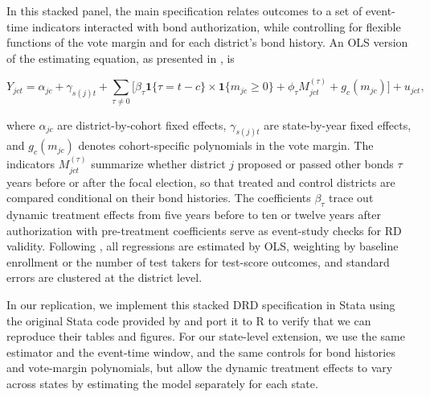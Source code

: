 In this stacked panel, the main specification relates outcomes to a set of event-time indicators interacted with bond authorization, while controlling for flexible functions of the vote margin and for each district’s bond history. An OLS version of the estimating equation, as presented in \citet{biasi_what_2025}, is

\[
Y_{jct}
= \alpha_{jc} + \gamma_{s(j)t}
+ \sum_{\tau \neq 0} \biggl[\beta_{\tau} \mathbf{1}\{\tau = t-c\} \times \mathbf{1}\{m_{jc} \ge 0\}
+ \phi_{\tau} M_{jct}^{(\tau)}
+ g_{c}(m_{jc})\biggr]
+ u_{jct},
\]

where $\alpha_{jc}$ are district-by-cohort fixed effects, $\gamma_{s(j)t}$ are state-by-year fixed effects, and $g_{c}(m_{jc})$ denotes cohort-specific polynomials in the vote margin. The indicators $M_{jct}^{(\tau)}$ summarize whether district $j$ proposed or passed other bonds $\tau$ years before or after the focal election, so that treated and control districts are compared conditional on their bond histories. The coefficients $\beta_{\tau}$ trace out dynamic treatment effects from five years before to ten or twelve years after authorization with pre-treatment coefficients serve as event-study checks for RD validity. Following \citet{biasi_what_2025}, all regressions are estimated by OLS, weighting by baseline enrollment or the number of test takers for test-score outcomes, and standard errors are clustered at the district level.

In our replication, we implement this stacked DRD specification in Stata using the original Stata code provided by \citet{biasi_what_2025} and port it to R to verify that we can reproduce their tables and figures. For our state-level extension, we use the same estimator and the event-time window, and the same controls for bond histories and vote-margin polynomials, but allow the dynamic treatment effects to vary across states by estimating the model separately for each state.

